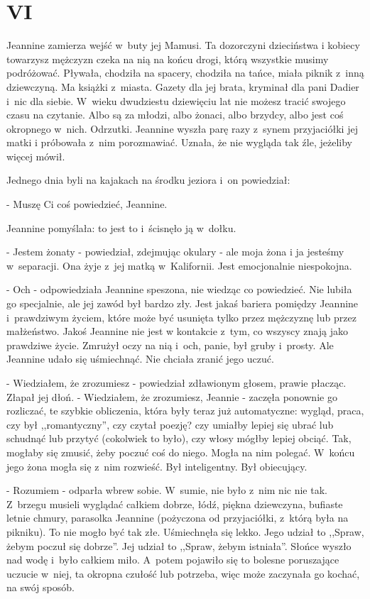 \documentclass[oneside,polish,12pt,sfheadings]{mwbk}
\begin{document}
\chapter{VI}

Jeannine zamierza wejść w~buty jej Mamusi. Ta dozorczyni dzieciństwa
i kobiecy towarzysz mężczyzn czeka na nią na końcu drogi, którą wszystkie
musimy podróżować. Pływała, chodziła na spacery, chodziła na tańce,
miała piknik z~inną dziewczyną. Ma książki z~miasta. Gazety dla jej
brata, kryminał dla pani Dadier i~nic dla siebie. W~wieku dwudziestu
dziewięciu lat nie możesz tracić swojego czasu na czytanie. Albo są
za młodzi, albo żonaci, albo brzydcy, albo jest coś okropnego w~nich.
Odrzutki. Jeannine wyszła parę razy z~synem przyjaciółki jej matki
i próbowała z~nim porozmawiać. Uznała, że nie wygląda tak źle, jeżeliby
więcej mówił.

Jednego dnia byli na kajakach na środku jeziora i~on powiedział: 

- Muszę Ci coś powiedzieć, Jeannine.

Jeannine pomyślała: to jest to i~ścisnęło ją w~dołku.

- Jestem żonaty - powiedział, zdejmując okulary - ale moja żona i
ja jesteśmy w~separacji. Ona żyje z~jej matką w~Kalifornii. Jest emocjonalnie
niespokojna.

- Och - odpowiedziała Jeannine speszona, nie wiedząc co powiedzieć.
Nie lubiła go specjalnie, ale jej zawód był bardzo zły. Jest jakaś
bariera pomiędzy Jeannine i~prawdziwym życiem, które może być usunięta
tylko przez mężczyznę lub przez małżeństwo. Jakoś Jeannine nie jest
w kontakcie z~tym, co wszyscy znają jako prawdziwe życie. Zmrużył
oczy na nią i~och, panie, był gruby i~prosty. Ale Jeannine udało się
uśmiechnąć. Nie chciała zranić jego uczuć.

- Wiedziałem, że zrozumiesz - powiedział zdławionym głosem, prawie
płacząc. Złapał jej dłoń. - Wiedziałem, że zrozumiesz, Jeannie - zaczęła
ponownie go rozliczać, te szybkie obliczenia, która były teraz już
automatyczne: wygląd, praca, czy był ,,romantyczny'', czy czytał poezję?
czy umiałby lepiej się ubrać lub schudnąć lub przytyć (cokolwiek to
było), czy włosy mógłby lepiej obciąć. Tak, mogłaby się zmusić, żeby
poczuć coś do niego. Mogła na nim polegać. W~końcu jego żona mogła
się z~nim rozwieść. Był inteligentny. Był obiecujący. 

- Rozumiem - odparła wbrew sobie. W~sumie, nie było z~nim nic nie tak. Z~brzegu
musieli wyglądać całkiem dobrze, łódź, piękna dziewczyna, bufiaste
letnie chmury, parasolka Jeannine (pożyczona od przyjaciółki, z~którą
była na pikniku). To nie mogło być tak złe. Uśmiechnęła się lekko.
Jego udział to ,,Spraw, żebym poczuł się dobrze''. Jej udział to ,,Spraw,
żebym istniała''. Słońce wyszło nad wodę i~było całkiem miło. A~potem
pojawiło się to bolesne poruszające uczucie w~niej, ta okropna czułość
lub potrzeba, więc może zaczynała go kochać, na swój sposób.
\end{document}

